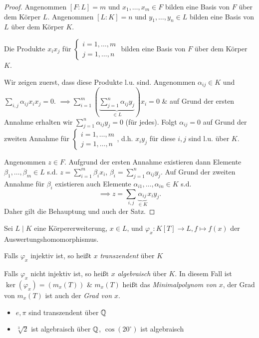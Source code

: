 \begin{proof}
	Angenommen $[F:L] = m$ und $x_1,\ldots, x_{m} \in F$ bilden  eine Basis von $F$ über dem Körper $L$.
	Angenommen $[L:K] = n$ und $y_1,\ldots,y_{n} \in L$ bilden eine Basis von $L$ über dem Körper $K$.
	\begin{claim}
		Die Produkte $x_i x_{j}$ für $\begin{cases}
			i = 1,\ldots,m\\
			j = 1,\ldots,n
		\end{cases}$
		bilden eine Basis von $F$ über dem Körper $K$.
	\end{claim}
	Wir zeigen zuerst, dass diese Produkte l.u. sind. Angenommen $\alpha_{ij} \in K$ und $\sum_{i,j} \alpha_{ij} x_{i} x_{j} = 0$.
	$\implies \sum_{i=1}^{m} \left( \underbrace{\sum_{j=1}^{n} \alpha_{ij} y_{j}}_{\in L} \right) x_{i} = 0$ \& auf Grund der ersten Annahme erhalten wir
	$\sum_{j=1}^{n} \alpha_{ij} y_{j} = 0$ (für jedes).
	Folgt $\alpha_{ij} = 0$ auf Grund der zweiten Annahme für $\begin{cases}
		i=1,\ldots,m\\
		j=1,\ldots,n
	\end{cases}$, d.h. $x_{i} y_{j}$ für diese $i,j$ sind l.u. über $K$.

	Angenommen $z \in F$. Aufgrund der ersten Annahme existieren dann Elemente $\beta_1,\ldots,\beta_{m} \in L$ s.d.
	$z = \sum_{i=1}^{m} \beta_{i} x_{i}$, $\beta_{i} = \sum_{j=1}^{n} \alpha_{i j} y_{j}$. Auf Grund der zweiten Annahme für $\beta_{i}$ existieren auch Elemente $\alpha_{i 1},\ldots, \alpha_{i n} \in K$ s.d.
	\[
	\implies z = \sum_{i,j} \underbrace{\alpha_{i j}}_{\in K} x_{i} y_{j}
	.\]
	Daher gilt die Behauptung und auch der Satz.
\end{proof}

\begin{definition}
	Sei $L \mid K$ eine Körpererweiterung, $x \in L$, und $\varphi_{x}: K[T] \to L, f \mapsto f(x)$ der Auswertungshomomorphismus.

	Falls $\varphi_{x}$ injektiv ist, so heißt $x$ \emph{transzendent} über $K$ 

	Falls $\varphi_{x}$ nicht injektiv ist, so heißt $x$ \emph{algebraisch} über $K$.
	In diesem Fall ist $\ker(\varphi_{x}) = (m_{x}(T))$ \& $m_{x}(T)$ heißt das
	\emph{Minimalpolynom von $x$}, der Grad von $m_{x}(T)$ ist auch der \emph{Grad von $x$}.
\end{definition}

\begin{eg}
	\begin{itemize}
		\item $e,\pi$ sind transzendent über $\mathbb{Q}$ 
		\item $\sqrt[3]{2}$ ist algebraisch über $\mathbb{Q}$, $\cos(20^{\circ})$ ist algebraisch 
	\end{itemize}
\end{eg}

